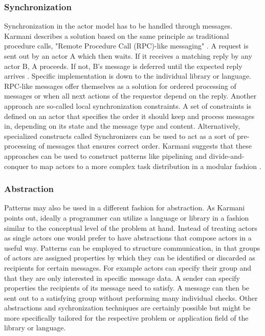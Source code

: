 \documentclass[A4]{article}
\begin{document}
\subsubsection{Synchronization}
Synchronization in the actor model  has to be handled through messages. Karmani describes a solution based on the same principle as traditional procedure calls, "Remote Procedure Call (RPC)-like messaging" \cite[p.~6]{reference/parallel/KarmaniA11}. A request is sent out by an actor A which then waits. If it receives a matching reply by any actor B, A proceeds. If not, B's message is deferred until the expected reply arrives \cite[p.~6]{reference/parallel/KarmaniA11}. Specific implementation is down to the individual library or language.
RPC-like messages offer themselves as a solution for ordered processing of messages or when all next actions of the requestor depend on the reply. 
Another approach are so-called local synchronization constraints. A set of constraints is defined on an actor that specifies the order it should keep and process messages in, depending on its state and the message type and content. \cite[p.~34]{Agha2016:2}
Alternatively, specialized constructs called Synchronizers can be used to act as a sort of pre-processing of messages that ensures correct order.
Karmani suggests that these approaches can be used to construct patterns like pipelining and divide-and-conquer to map actors to a more complex task distribution in a modular fashion \cite[p.~6]{reference/parallel/KarmaniA11}.
\subsubsection{Abstraction}
Patterns may also be used in a different fashion for abstraction. As Karmani points out, ideally a programmer can utilize a language or library in a fashion similar to the conceptual level of the problem at hand. Instead of treating actors as single actors one would prefer to have abstractions that compose actors in a useful way. \cite[p.~7]{reference/parallel/KarmaniA11}
Patterns can be employed to structure communication, in that groups of actors are assigned properties by which they can be identified or discarded as recipients for certain messages. For example actors can specify their group and that they are only interested in specific message data. A sender can specify properties the recipients of its message need to satisfy. A message can then be sent out to a satisfying group without performing many individual checks. 
Other abstractions and sychronization techniques are certainly possible but might be more specifically tailored for the respective problem or application field of the library or language.
\end{document}
